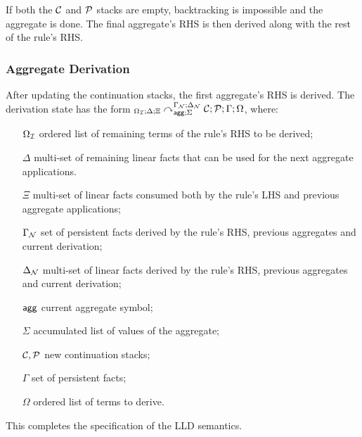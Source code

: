 If both the $\mathcal{C}$ and $\mathcal{P}$ stacks are empty, backtracking is
impossible and the aggregate is done. The final aggregate's RHS is then derived
along with the rest of the rule's RHS.



\subsubsection{Aggregate Derivation}

After updating the continuation stacks, the first aggregate's RHS is derived.
The derivation state has the form
${{}_{\Omega_{\mathcal{I}} ; \Delta ; \Xi}\curvearrowright}_{\mathsf{agg} ; \Sigma}^{\Gamma_{\mathcal{N}}; \Delta_{\mathcal{N}}} \; \mathcal{C};
\mathcal{P} ; \Gamma ; \Omega$, where:

\begin{enumerate}

   \item[$\Omega_{\mathcal{I}}$] ordered list of remaining terms of the rule's RHS to be
      derived;

   \item[$\Delta$] multi-set of remaining linear facts that can be used for
   the next aggregate applications.

   \item[$\Xi$] multi-set of linear facts consumed both by the rule's LHS and
      previous aggregate applications;

   \item[$\Gamma_{\mathcal{N}}$] set of persistent facts derived by the rule's RHS, previous
      aggregates and current derivation;

   \item[$\Delta_{\mathcal{N}}$] multi-set of linear facts derived by the rule's RHS,
      previous aggregates and current derivation;

   \item[$\mathsf{agg}$] current aggregate symbol;
   \item[$\Sigma$] accumulated list of values of the aggregate;
   \item[$\mathcal{C}, \mathcal{P}$] new continuation stacks;
   \item[$\Gamma$] set of persistent facts;
   \item[$\Omega$] ordered list of terms to derive.
\end{enumerate}



This completes the specification of the LLD semantics.

